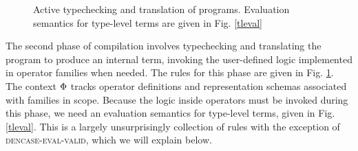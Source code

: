 \documentclass{llncs}
\begin{document}
\begin{figure}[t]
\begin{mathpar}
\end{mathpar}
\vspace{-10pt}
\caption{\small Active typechecking and translation of programs. Evaluation semantics for type-level terms are given in Fig. \ref{tleval}}
\label{att}
\vspace{-10pt}
\end{figure}
The second phase of compilation involves typechecking and translating the program to produce an internal term, invoking the user-defined logic implemented in operator families when needed. The rules for this phase are given in Fig. \ref{att}. The context $\fvalCtx$ tracks operator definitions and representation schemas associated with families in scope. Because the logic inside operators must be invoked during this phase, we need an evaluation semantics for type-level terms, given in Fig. \ref{tleval}. This is a largely unsurprisingly collection of rules with the exception of \textsc{dencase-eval-valid}, which we will explain below.
\end{document}
